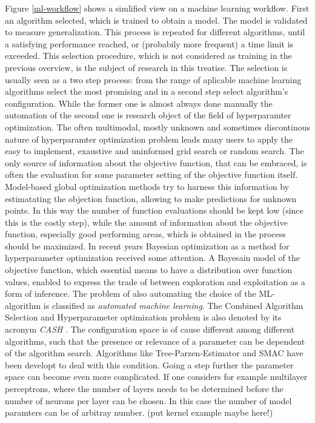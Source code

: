 \documentclass[english]{article}
\begin{document}
Figure \ref{ml-workflow} shows a simlified view on a machine learning workflow. First an algorithm selected, which is trained to obtain a model. The model is validated to measure generalization. This process is repeated for different algorithms, until a satisfying performance reached, or (probabily more frequent) a time limit is exceeded. This selection procedure, which is not considered as training in the previous overview, is the subject of research in this treatise.
The selection is usually seen as a two step process: from the range of aplicable machine learning algorithms select the most promising and in a second step select algorithm's configuration. While the former one is almost always done manually the automation of the second one is research object of the field of hyperparamter optimization.
The often multimodal, mostly unknown and sometimes discontinous nature of hyperparamter optimization problem leads many users to apply the easy to implement, exaustive and uninformed grid search or random search. The only source of information about the objective function, that can be embraced, is often the evaluation for some parameter setting of the objective function itself. Model-based global optimization methods try to harness this information by estimatating the objection function, allowing to make predictions for unknown points. In this way the number of function evaluations should be kept low (since this is the costly step), while the amount of information about the objective function, especially good performing areas, which is obtained in the process should be maximized.
In recent years Bayesian optimization as a method for hyperparameter optimization received some attention. A Bayesain model of the objective function, which essential means to have a distribution over function values, enabled to express the trade of between exploration and exploitation as a form of inference.
The problem of also automating the choice of the ML-algorithm is classified as \textit{automated machine learning}. The Combined Algorithm Selection and Hyperparameter optimization problem is also denoted by its acronym \textit{CASH} \cite{feurer_efficient_2015}. The configuration space is of cause different among different algorithms, such that the presence or relevance of a parameter can be dependent of the algorithm search. Algorithms like Tree-Parzen-Estimator and SMAC have been developt to deal with this condition.
Going a step further the parameter space can become even more complicated. If one considers for example multilayer perceptrons, where the number of layers needs to be determined before the number of neurons per layer can be chosen. In this case the number of model paramters can be of arbitray number. (put kernel example maybe here!)
\end{document}
